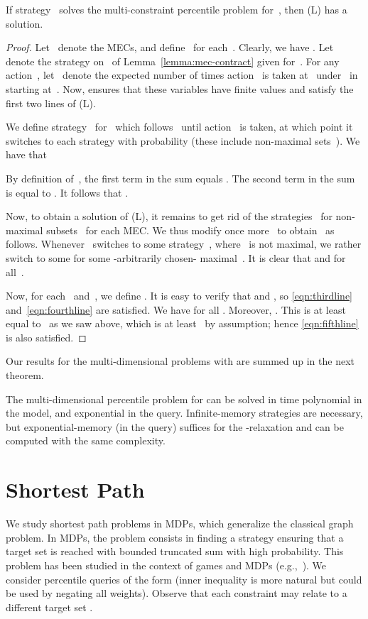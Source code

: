 \documentclass{llncs}
\begin{document}
\begin{lemma}
  If strategy~ solves the multi-constraint percentile problem for~, then (L) has a solution.
\end{lemma}
\begin{proof}
  Let~ denote the MECs,
  and define~ for each~.
  Clearly, we have .
  Let~ denote the strategy on~ of Lemma~\ref{lemma:mec-contract} given for~.
  For any action~, let~ denote the expected number of times action~ is taken at~ under~
  in~ starting at~. 
  Now, \cite[Lemma 3.3]{EKVY-lmcs08} ensures that these variables have finite values and satisfy the 
  first two lines of (L).

  We define strategy~ for~ which follows~ until action~ is taken, at which point
  it switches to each strategy  with probability 	(these include non-maximal sets~).
  We have that 
  
  By definition of~, the first term in the sum equals
  .
  The second term in the sum is equal to . 
  It follows that .

  Now, to obtain a solution of (L), it remains to get rid of the strategies~ for non-maximal subsets~ for each MEC.
  We thus modify once more~ to obtain~ as follows. Whenever~ switches to some strategy~,
  where~ is not maximal, we rather switch to some  for some -arbitrarily chosen- maximal~.
  It is clear that  and
   for all~.
  
  Now, for each~ and~, we define .
  It is easy to verify that  and , so \eqref{eqn:thirdline} and~\eqref{eqn:fourthline} are satisfied.
  We have 
  for all . Moreover, .
  This is at least equal to~ as we saw above, which is at least~ by assumption; hence \eqref{eqn:fifthline} is also satisfied.
\end{proof}

Our results for the multi-dimensional problems with  are summed up in the next theorem.

\begin{theorem}
\label{thm:mpinf}
  The multi-dimensional percentile problem for  can be solved in 
  time polynomial in the model, and exponential in the query.
  Infinite-memory strategies are necessary, but exponential-memory (in the query) suffices
  for the -relaxation and can be computed with the same complexity.
\end{theorem}

\section{Shortest Path}
\label{sec:sp}
We study shortest path problems in MDPs, which generalize the classical graph problem. In MDPs, the problem consists in finding a strategy ensuring that a target set is reached with bounded truncated sum with high probability.
This problem has been studied in the context of games and MDPs (e.g.,~\cite{bertsekas_MOR1991,DBLP:conf/concur/Alfaro99,DBLP:conf/stacs/BruyereFRR14}).
We consider percentile queries of the form  (inner inequality  is more natural but  could be used by negating all weights). Observe that each constraint  may relate to a different target set .
\end{document}
